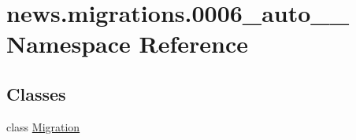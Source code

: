 \hypertarget{namespacenews_1_1migrations_1_10006__auto__20181013__0120}{}\section{news.\+migrations.0006\+\_\+auto\+\_\+\_ Namespace Reference}
\label{namespacenews_1_1migrations_1_10006__auto__20181013__0120}
\subsection*{Classes}
\begin{DoxyCompactItemize}
\item 
class \mbox{\hyperlink{classnews_1_1migrations_1_10006__auto__20181013__0120_1_1_migration}{Migration}}
\end{DoxyCompactItemize}
